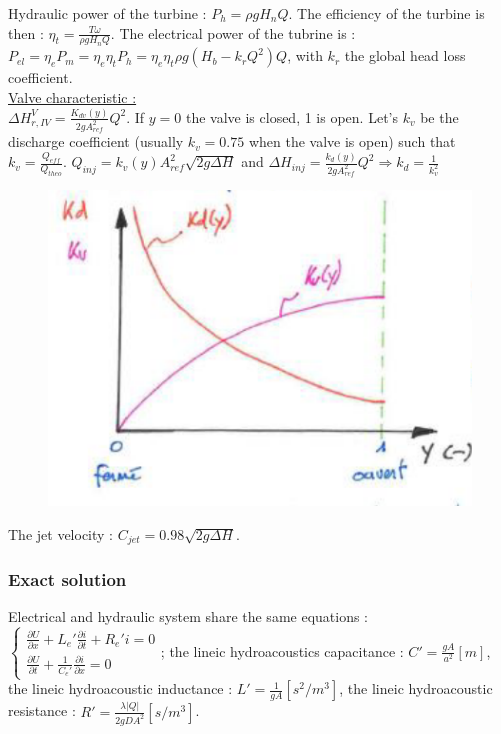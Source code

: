 \documentclass[../main.tex]{subfiles}
\begin{document}
Hydraulic power of the turbine : $P_h = \rho g H_n Q$. The efficiency of the turbine is then : $\eta_t = \frac{T\omega}{\rho g H_nQ}$. The electrical power of the tubrine is : $P_{el} = \eta_e P_m = \eta_e \eta_t P_h = \eta_e \eta_t \rho g (H_b-k_r Q^2)Q$, with $k_r$ the global head loss coefficient.\\

\quad \underline{Valve characteristic :}\\
$\Delta H_{r,IV}^V = \frac{K_{dv}(y)}{2gA_{ref}^2} Q^2$. If $y=0$ the valve is closed, 1 is open. Let's $k_v$ be the discharge coefficient (usually $k_v = 0.75$ when the valve is open) such that $k_v = \frac{Q_{eff}}{Q_{theo}}$. $Q_{inj} = k_v(y) A_{ref}^2 \sqrt{2g\Delta H}$ and $\Delta H_{inj} = \frac{k_d(y)}{2gA_{ref}^2}Q^2 \Rightarrow k_d = \frac{1}{k_v^2}$

\begin{figure}[hbt!]
    \centering
    \includegraphics[width=0.6\linewidth]{IMAGES/Hydraulic/Screenshot from 2025-02-28 11-47-55.png}
\end{figure}

The jet velocity : $C_{jet} = 0.98 \sqrt{2g\Delta H}$. 

\subsubsection{Exact solution}
Electrical and hydraulic system share the same equations : $\begin{cases}
    \frac{\partial U}{\partial x}+ L_e' \frac{\partial i}{\partial t} + R_e' i = 0\\ \frac{\partial U}{\partial t} + \frac{1}{C_e'} \frac{\partial i}{\partial x} =0
\end{cases}$; the lineic hydroacoustics capacitance : $C' = \frac{gA}{a^2}[m]$, the lineic hydroacoustic inductance : $L' = \frac{1}{gA} [s^2/m^3]$, the lineic hydroacoustic resistance : $R' = \frac{\lambda \lvert Q \rvert}{2gDA^2} [s/m^3]$.\\
\end{document}
